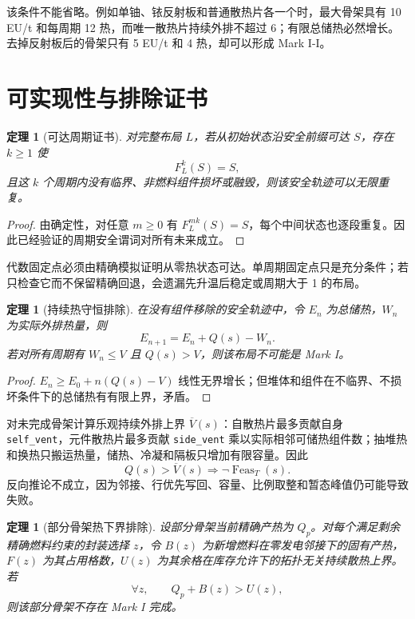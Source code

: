 \documentclass[UTF8,11pt]{ctexart}
\newtheorem{theorem}[definition]{定理}
\begin{document}
该条件不能省略。例如单铀、铱反射板和普通散热片各一个时，最大骨架具有 10 EU/t 和每周期 12 热，而唯一散热片持续外排不超过 6；有限总储热必然增长。去掉反射板后的骨架只有 5 EU/t 和 4 热，却可以形成 Mark I-I。

\section{可实现性与排除证书}

\begin{theorem}[可达周期证书]
对完整布局 $L$，若从初始状态沿安全前缀可达 $S$，存在 $k\ge1$ 使
\[
F_L^k(S)=S,
\]
且这 $k$ 个周期内没有临界、非燃料组件损坏或融毁，则该安全轨迹可以无限重复。
\end{theorem}

\begin{proof}
由确定性，对任意 $m\ge0$ 有 $F_L^{mk}(S)=S$，每个中间状态也逐段重复。因此已经验证的周期安全谓词对所有未来成立。
\end{proof}

代数固定点必须由精确模拟证明从零热状态可达。单周期固定点只是充分条件；若只检查它而不保留精确回退，会遗漏先升温后稳定或周期大于 1 的布局。

\begin{theorem}[持续热守恒排除]
在没有组件移除的安全轨迹中，令 $E_n$ 为总储热，$W_n$ 为实际外排热量，则
\[
E_{n+1}=E_n+Q(s)-W_n.
\]
若对所有周期有 $W_n\le V$ 且 $Q(s)>V$，则该布局不可能是 Mark I。
\end{theorem}

\begin{proof}
$E_n\ge E_0+n(Q(s)-V)$ 线性无界增长；但堆体和组件在不临界、不损坏条件下的总储热有有限上界，矛盾。
\end{proof}

对未完成骨架计算乐观持续外排上界 $\overline V(s)$：自散热片最多贡献自身 \texttt{self\_vent}，元件散热片最多贡献 \texttt{side\_vent} 乘以实际相邻可储热组件数；抽堆热和换热只搬运热量，储热、冷凝和隔板只增加有限容量。因此
\[
Q(s)>\overline V(s)
\Longrightarrow
\neg\operatorname{Feas}_T(s).
\]
反向推论不成立，因为邻接、行优先写回、容量、比例取整和暂态峰值仍可能导致失败。

\begin{theorem}[部分骨架热下界排除]
设部分骨架当前精确产热为 $Q_p$。对每个满足剩余精确燃料约束的封装选择 $z$，令 $B(z)$ 为新增燃料在零发电邻接下的固有产热，$F(z)$ 为其占用格数，$U(z)$ 为其余格在库存允许下的拓扑无关持续散热上界。若
\[
\forall z,\qquad Q_p+B(z)>U(z),
\]
则该部分骨架不存在 Mark I 完成。
\end{theorem}
\end{document}
